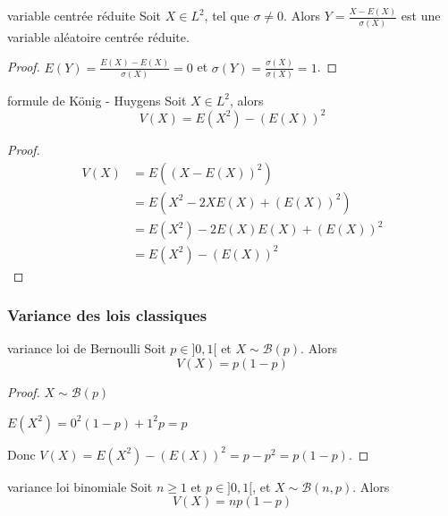\begin{corollaire}{variable centrée réduite}{}
    Soit $X \in L^2$, tel que $\sigma \neq 0$. Alors 
    $Y = \frac{X - E(X)}{\sigma(X)}$ est une variable aléatoire centrée réduite.
\end{corollaire}

\begin{proof}
    $E(Y) = \frac{E(X) - E(X)}{\sigma(X)} = 0$ et 
    $\sigma(Y) = \frac{\sigma(X)}{\sigma(X)} = 1$.
\end{proof}

\begin{proposition}{formule de König - Huygens}{}
    Soit $X \in L^2$, alors
    $$ V(X) = E(X^2) - (E(X))^2 $$
\end{proposition}

\begin{proof}
    \begin{align}
        V(X) & = E\left( (X - E(X))^2 \right) \\
        & = E(X^2 - 2 X E(X) + (E(X))^2) \\
        & = E(X^2) - 2 E(X) E(X) + (E(X))^2 \\
        & = E(X^2) - (E(X))^2
    \end{align}
\end{proof}

\subsubsection{Variance des lois classiques }

\begin{proposition}{variance loi de Bernoulli}{}
    Soit $p \in ]0, 1[$ et $X \sim \mathcal B(p)$. Alors 
    $$ V(X) = p(1 - p) $$
\end{proposition}

\begin{proof}
    $X \sim \mathcal B(p)$ 

    $E(X^2) = 0^2 (1 - p) + 1^2 p = p$

    Donc $V(X) = E(X^2) - (E(X))^2 = p - p^2 = p(1 - p)$.
\end{proof}


\begin{proposition}{variance loi binomiale}{}
    Soit $n \geqslant 1$ et $p \in ]0, 1[$, et $X \sim \mathcal B(n, p)$. Alors 
    $$ V(X) = n p (1 - p) $$
\end{proposition}


